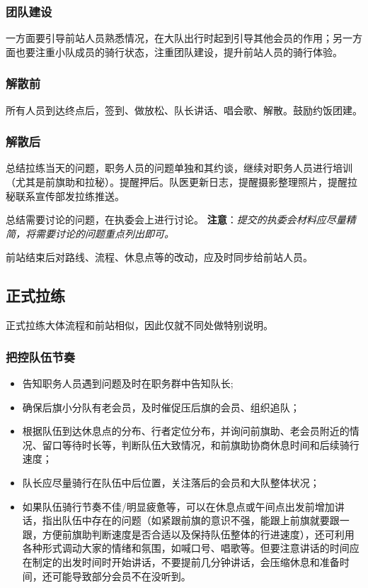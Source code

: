 \documentclass[UTF8]{ctexart}
\begin{document}
\subsubsection{团队建设}

一方面要引导前站人员熟悉情况，在大队出行时起到引导其他会员的作用；另一方面也要注重小队成员的骑行状态，注重团队建设，提升前站人员的骑行体验。

\subsubsection{解散前}

所有人员到达终点后，签到、做放松、队长讲话、唱会歌、解散。鼓励约饭团建。

\subsubsection{解散后}

总结拉练当天的问题，职务人员的问题单独和其约谈，继续对职务人员进行培训（尤其是前旗助和拉秘）。提醒押后。队医更新日志，提醒摄影整理照片，提醒拉秘联系宣传部发拉练推送。

总结需要讨论的问题，在执委会上进行讨论。
\textbf{注意}：\textit{提交的执委会材料应尽量精简，将需要讨论的问题重点列出即可。}

前站结束后对路线、流程、休息点等的改动，应及时同步给前站人员。

\subsection{正式拉练}

正式拉练大体流程和前站相似，因此仅就不同处做特别说明。

\subsubsection{把控队伍节奏}

\begin{itemize}[nosep,left=2em]
    \item 告知职务人员遇到问题及时在职务群中告知队长;
    \item 确保后旗小分队有老会员，及时催促压后旗的会员、组织追队；
    \item 根据队伍到达休息点的分布、行者定位分布，并询问前旗助、老会员附近的情况、留口等待时长等，判断队伍大致情况，和前旗助协商休息时间和后续骑行速度；
    \item 队长应尽量骑行在队伍中后位置，关注落后的会员和大队整体状况；
    \item 如果队伍骑行节奏不佳/明显疲惫等，可以在休息点或午间点出发前增加讲话，指出队伍中存在的问题（如紧跟前旗的意识不强，能跟上前旗就要跟一跟，方便前旗助判断速度是否合适以及保持队伍整体的行进速度），还可利用各种形式调动大家的情绪和氛围，如喊口号、唱歌等。但要注意讲话的时间应在制定的出发时间时开始讲话，不要提前几分钟讲话，会压缩休息和准备时间，还可能导致部分会员不在没听到。
\end{itemize}
\end{document}
